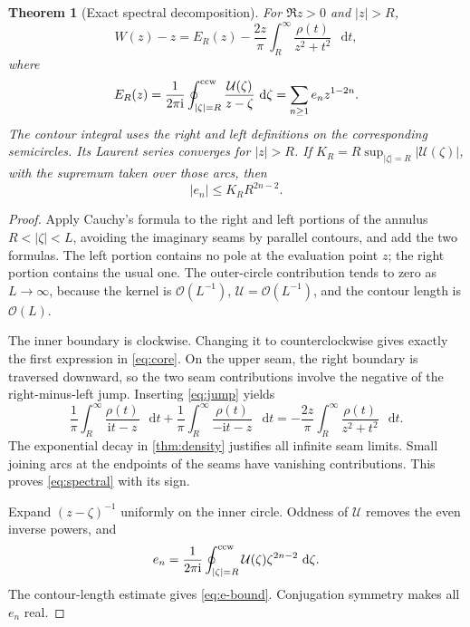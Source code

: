 \documentclass[11pt,a4paper]{article}
\newtheorem{theorem}{Theorem}[section]
\theoremstyle{definition}
\numberwithin{equation}{section}
\newcommand{\dd}{\mathop{}\!\mathrm{d}}
\newcommand{\ii}{\mathrm{i}}
\newcommand{\Oh}{\mathcal O}
\newcommand{\U}{\mathcal U}
\begin{document}
\begin{theorem}[Exact spectral decomposition]
\label{thm:spectral}
For $\Re z>0$ and $|z|>R$,
\begin{equation}
 W(z)-z=E_R(z)-\frac{2z}{\pi}
       \int_R^\infty\frac{\rho(t)}{z^2+t^2}\,\dd t,
 \label{eq:spectral}
\end{equation}
where
\begin{equation}
 E_R(z)=\frac1{2\pi\ii}\oint_{|\zeta|=R}^{\rm ccw}
           \frac{\U(\zeta)}{z-\zeta}\,\dd\zeta
       =\sum_{n\ge1}e_nz^{1-2n}.
 \label{eq:core}
\end{equation}
The contour integral uses the right and left definitions on the corresponding semicircles. Its Laurent series converges for $|z|>R$. If
$K_R=R\sup_{|\zeta|=R}|\U(\zeta)|$, with the supremum taken over those arcs, then
\begin{equation}
 |e_n|\le K_R R^{2n-2}.
 \label{eq:e-bound}
\end{equation}
\end{theorem}
\begin{proof}
Apply Cauchy's formula to the right and left portions of the annulus $R<|\zeta|<L$, avoiding the imaginary seams by parallel contours, and add the two formulas. The left portion contains no pole at the evaluation point $z$; the right portion contains the usual one. The outer-circle contribution tends to zero as $L\to\infty$, because the kernel is $\Oh(L^{-1})$, $\U=\Oh(L^{-1})$, and the contour length is $\Oh(L)$.

The inner boundary is clockwise. Changing it to counterclockwise gives exactly the first expression in \eqref{eq:core}. On the upper seam, the right boundary is traversed downward, so the two seam contributions involve the negative of the right-minus-left jump. Inserting \eqref{eq:jump} yields
\[
 \frac1\pi\int_R^\infty\frac{\rho(t)}{\ii t-z}\,\dd t
 +\frac1\pi\int_R^\infty\frac{\rho(t)}{-\ii t-z}\,\dd t
 =-\frac{2z}{\pi}\int_R^\infty\frac{\rho(t)}{z^2+t^2}\,\dd t.
\]
The exponential decay in \cref{thm:density} justifies all infinite seam limits. Small joining arcs at the endpoints of the seams have vanishing contributions. This proves \eqref{eq:spectral} with its sign.

Expand $(z-\zeta)^{-1}$ uniformly on the inner circle. Oddness of $\U$ removes the even inverse powers, and
\begin{equation}
 e_n=\frac1{2\pi\ii}\oint_{|\zeta|=R}^{\rm ccw}
              \U(\zeta)\zeta^{2n-2}\,\dd\zeta.
 \label{eq:e-contour}
\end{equation}
The contour-length estimate gives \eqref{eq:e-bound}. Conjugation symmetry makes all $e_n$ real.
\end{proof}
\end{document}
